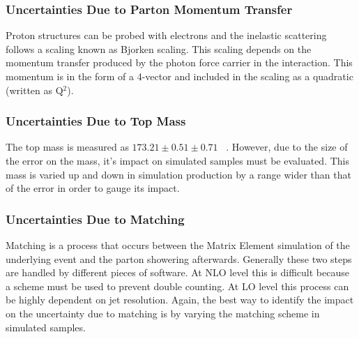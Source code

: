 \subsubsection{Uncertainties Due to Parton Momentum Transfer}
Proton structures can be probed with electrons and the inelastic scattering follows a scaling known as Bjorken scaling. This scaling depends on the momentum transfer produced by the photon force carrier in the interaction. This momentum is in the form of a 4-vector and included in the scaling as a quadratic (written as Q$^2$).\\

\subsubsection{Uncertainties Due to Top Mass}
The top mass is measured as $173.21 \pm 0.51 \pm 0.71$ \GeV~\cite{pdg}. However, due to the size of the error on the mass, it's impact on simulated samples must be evaluated. This mass is varied up and down in simulation production by a range wider than that of the error in order to gauge its impact.\\


\subsubsection{Uncertainties Due to Matching}
Matching is a process that occurs between the Matrix Element simulation of the underlying event and the parton showering afterwards. Generally these two steps are handled by different pieces of software. At NLO level this is difficult because a scheme must be used to prevent double counting. At LO level this process can be highly dependent on jet resolution. Again, the best way to identify the impact on the uncertainty due to matching is by varying the matching scheme in simulated samples.\\


